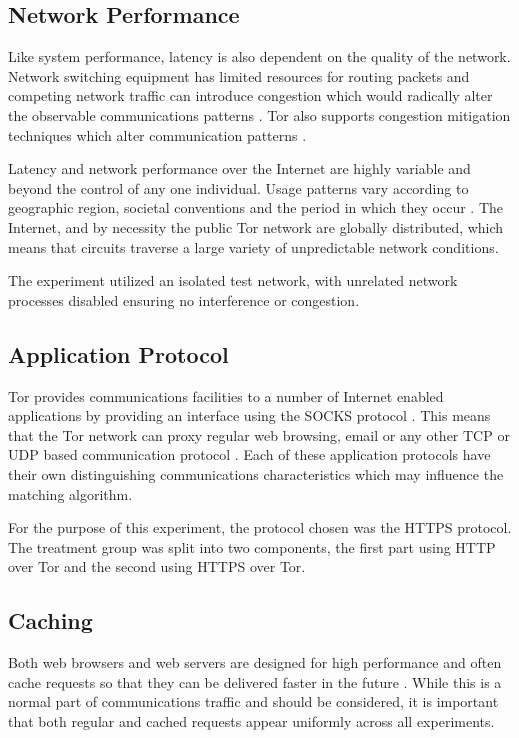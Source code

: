 \documentclass{ecuthesis}
\begin{document}
\subsection{Network Performance}

Like system performance, latency is also dependent on the quality of the
network. Network switching equipment has limited resources for routing packets
and competing network traffic can introduce congestion which would radically
alter the observable communications patterns \parencite{Jacobson:1995p6768}.
Tor also supports congestion mitigation techniques which alter communication
patterns \parencite[8]{Dingledine:2004p314}.

Latency and network performance over the Internet are highly variable and
beyond the control of any one individual. Usage patterns vary according to
geographic region, societal conventions and the period in which they occur
\parencite{Thompson97wide-areainternet,Ken03longitudinalstudy}. The Internet,
and by necessity the public Tor network are globally distributed, which means
that circuits traverse a large variety of unpredictable network conditions.

The experiment utilized an isolated test network, with unrelated network
processes disabled ensuring no interference or congestion.

\subsection{Application Protocol}

Tor provides communications facilities to a number of Internet enabled
applications by providing an interface using the SOCKS protocol
\parencite[17]{Dingledine:2004p314}. This means that the Tor network can proxy
regular web browsing, email or any other TCP or UDP based communication protocol
\parencite{website:socks}. Each of these application protocols have their own
distinguishing communications characteristics which may influence the matching
algorithm.

For the purpose of this experiment, the protocol chosen was the HTTPS protocol.
The treatment group was split into two components, the first part using HTTP
over Tor and the second using HTTPS over Tor.

\subsection{Caching}

Both web browsers and web servers are designed for high performance and often
cache requests so that they can be delivered faster in the future
\parencite{Caceres:1998p7419}. While this is a normal part of communications
traffic and should be considered, it is important that both regular and cached
requests appear uniformly across all experiments.
\end{document}
